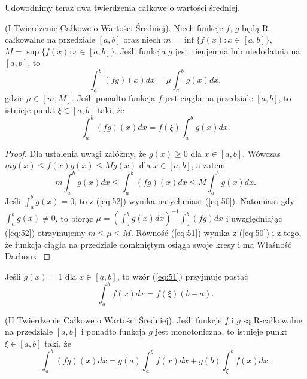 \documentclass[leqno]{article}
\begin{document}
\begin{justify}
Udowodnimy teraz dwa twierdzenia całkowe o wartości średniej.

\begin{theorem}
{
    (I Twierdzenie Całkowe o Wartości Średniej). Niech funkcje $f$, $g$ będą R-całkowalne na przedziale
    $[a,b]$ oraz niech $m = \inf\{f(x) : x \in [a,b]\}$, $ M = \sup\{f(x) : x \in [a,b]\}$. Jeśli funkcja $g$
    jest nieujemna lub niedodatnia na $[a,b]$, to
    \begin{equation}\label{eq:50}
        \int_{a}^{b}(fg)(x)dx = \mu \int_{a}^{b}g(x)dx,
    \end{equation}
    gdzie $\mu \in [m, M]$. Jeśli ponadto funkcja $f$ jest ciągła na przedziale $[a,b]$, to istnieje punkt 
    $\xi \in [a,b]$ taki, że 
    \begin{equation}\label{eq:51}
        \int_{a}^{b}(fg)(x)dx = f(\xi)\int_{a}^{b}g(x)dx.
    \end{equation}
}
\end{theorem}

\begin{proof}
    Dla ustalenia uwagi załóżmy, że $g(x) \geqslant 0$ dla $x \in [a,b]$. Wówczas $mg(x) \leqslant f(x)g(x) \leqslant Mg(x)$ dla $x \in [a,b]$, a zatem
    \begin{equation}\label{eq:52}
        m\int_{a}^{b}g(x)dx \leqslant \int_{a}^{b}(fg)(x)dx \leqslant M\int_{a}^{b}g(x)dx.
    \end{equation}
    Jeśli $\int_{a}^{b}g(x) = 0$, to z (\ref{eq:52}) wynika natychmiast (\ref{eq:50}).
    Natomiast gdy $\int_{a}^{b}g(x) \neq 0$, to biorąc
    $\mu = (\int_{a}^{b}g(x)dx)^{-1} \int_{a}^{b}(fg)dx$ i uwzględniając (\ref{eq:52}) otrzymujemy
    $m \leqslant \mu \leqslant M$. 
    Równość (\ref{eq:51}) wynika z (\ref{eq:50}) i z tego, że funkcja ciągła na przedziale domkniętym osiąga swoje kresy i ma Właśność Darboux.
\end{proof}

\begin{wniosek}
{
    Jeśli $g(x) = 1$ dla $x \in [a,b]$, to wzór (\ref{eq:51}) przyjmuje postać
    \[
        \int_{a}^{b}f(x)dx = f(\xi)(b-a).
    \]
}
\end{wniosek}

\begin{theorem}
{
    (II Twierdzenie Całkowe o Wartości Średniej). Jeśli funkcje $f$ i $g$ są R-całkowalne na przedziale $[a,b]$ i ponadto funkcja $g$ jest monotoniczna,
    to istnieje punkt $\xi \in [a,b]$ taki, że
    \begin{equation}\label{eq:53}
        \int_{a}^{b}(fg)(x)dx = g(a)\int_{a}^{\xi}f(x)dx + g(b)\int_{\xi}^{b}f(x)dx.
    \end{equation}
}
\end{theorem}


\end{justify}
\end{document}
